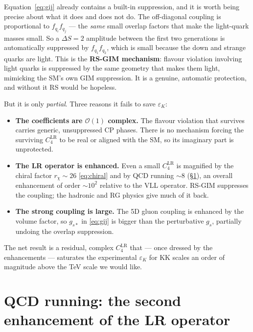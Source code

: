 \documentclass[11pt]{article}
\newcommand{\epsK}{\varepsilon_K}
\newcommand{\gss}{g_{s*}}
\theoremstyle{definition}
\begin{document}
Equation~\eqref{eq:gij} already contains a built-in suppression, and it is worth
being precise about what it does and does not do. The off-diagonal coupling is
proportional to $f_{q_i} f_{q_j}$ --- the \emph{same} small overlap factors that
make the light-quark masses small. So a $\Delta S=2$ amplitude between the first
two generations is automatically suppressed by $f_{q_1} f_{q_2}$, which is small
because the down and strange quarks are light. This is the \textbf{RS-GIM
mechanism}: flavour violation involving light quarks is suppressed by the same
geometry that makes them light, mimicking the SM's own GIM suppression. It is a
genuine, automatic protection, and without it RS would be hopeless.

But it is only \emph{partial}. Three reasons it fails to save $\epsK$:
\begin{itemize}[leftmargin=1.4em]
\item \textbf{The coefficients are $\mathcal{O}(1)$ complex.} The flavour
violation that survives carries generic, unsuppressed CP phases. There is no
mechanism forcing the surviving $C_{4}^{\mathrm{LR}}$ to be real or aligned with
the SM, so its imaginary part is unprotected.
\item \textbf{The LR operator is enhanced.} Even a small $C_4^{\mathrm{LR}}$ is
magnified by the chiral factor $r_\chi\sim26$ \eqref{eq:chiral} and by QCD running
$\sim8$ (\S\ref{sec:running}), an overall enhancement of order $\sim10^2$ relative
to the VLL operator. RS-GIM suppresses the coupling; the hadronic and RG physics
give much of it back.
\item \textbf{The strong coupling is large.} The 5D gluon coupling is enhanced by
the volume factor, so $\gss$ in \eqref{eq:gij} is bigger than the perturbative
$g_s$, partially undoing the overlap suppression.
\end{itemize}
The net result is a residual, complex $C_4^{\mathrm{LR}}$ that --- once dressed by
the enhancements --- saturates the experimental $\epsK$ for KK scales an order of
magnitude above the TeV scale we would like.

\section{QCD running: the second enhancement of the LR operator}
\label{sec:running}
\end{document}
